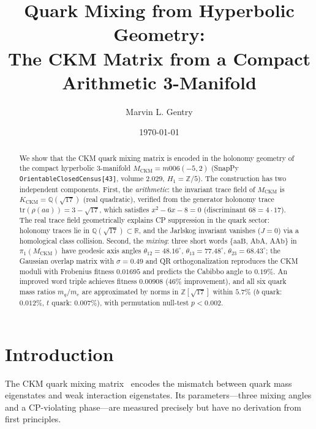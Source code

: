 \documentclass[11pt,a4paper]{article}
\theoremstyle{definition}
\theoremstyle{remark}
\newcommand{\MCKM}{M_{\mathrm{CKM}}}
\newcommand{\KCKM}{K_{\mathrm{CKM}}}
\newcommand{\Zsev}{\mathbb{Z}[\sqrt{17}]}
\newcommand{\Zfive}{\mathbb{Z}/5}
\begin{document}
\title{Quark Mixing from Hyperbolic Geometry:\\
The CKM Matrix from a Compact Arithmetic 3-Manifold}

\author[1]{Marvin L. Gentry}
\date{\today}
\maketitle

\begin{abstract}
We show that the CKM quark mixing matrix is encoded in the holonomy
geometry of the compact hyperbolic 3-manifold
$\MCKM = m006(-5,2)$ (SnapPy \texttt{OrientableClosedCensus[43]},
volume $2.029$, $H_1 = \Zfive$).
The construction has two independent components.
First, the \emph{arithmetic}: the invariant trace field of $\MCKM$ is
$\KCKM = \mathbb{Q}(\sqrt{17})$ (real quadratic), verified from the
generator holonomy trace $\mathrm{tr}(\rho(aa)) = 3 - \sqrt{17}$,
which satisfies $x^2-6x-8=0$ (discriminant $68=4\cdot17$).
The real trace field geometrically explains CP suppression in the
quark sector: holonomy traces lie in $\mathbb{Q}(\sqrt{17})
\subset\mathbb{R}$, and the Jarlskog invariant vanishes ($J=0$) via
a homological class collision.
Second, the \emph{mixing}: three short words
$\{\mathrm{aaB},\,\mathrm{AbA},\,\mathrm{AAb}\}$ in
$\pi_1(\MCKM)$ have geodesic axis angles
$\theta_{12}=48.16^\circ$, $\theta_{13}=77.48^\circ$,
$\theta_{23}=68.43^\circ$; the Gaussian overlap matrix with
$\sigma=0.49$ and QR orthogonalization reproduces the CKM moduli
with Frobenius fitness $0.01695$ and predicts the Cabibbo angle to
$0.19\%$.
An improved word triple achieves fitness $0.00908$ ($46\%$
improvement), and all six quark mass ratios $m_q/m_e$ are
approximated by norms in $\Zsev$ within $5.7\%$
($b$ quark: $0.012\%$, $t$ quark: $0.007\%$),
with permutation null-test $p<0.002$.
\end{abstract}

\tableofcontents

\section{Introduction}
\label{sec:intro}

The CKM quark mixing matrix~\cite{Cabibbo1963,KM1973} encodes the
mismatch between quark mass eigenstates and weak interaction
eigenstates. Its parameters---three mixing angles and a CP-violating
phase---are measured precisely but have no derivation from first
principles.
\end{document}
